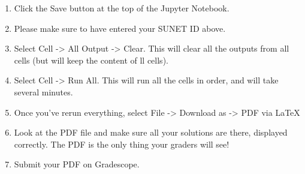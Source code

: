 \documentclass[18pt]{article}
\providecommand{\tightlist}{%
      \setlength{\itemsep}{0pt}\setlength{\parskip}{0pt}}
\begin{document}
\begin{enumerate}
\def\labelenumi{\arabic{enumi}.}
\tightlist
\item
  Click the Save button at the top of the Jupyter Notebook.
\item
  Please make sure to have entered your SUNET ID above.
\item
  Select Cell -\textgreater{} All Output -\textgreater{} Clear. This
  will clear all the outputs from all cells (but will keep the content
  of ll cells).
\item
  Select Cell -\textgreater{} Run All. This will run all the cells in
  order, and will take several minutes.
\item
  Once you've rerun everything, select File -\textgreater{} Download as
  -\textgreater{} PDF via LaTeX
\item
  Look at the PDF file and make sure all your solutions are there,
  displayed correctly. The PDF is the only thing your graders will see!
\item
  Submit your PDF on Gradescope.
\end{enumerate}


    
    
    
    
\end{document}
